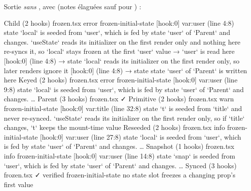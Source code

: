 Sortie \emph{sans} , avec  (notes élaguées sauf pour ) :

\begin{sortie}
  Child  (2 hooks)  frozen.tsx
    error  frozen-initial-state  [hook:0]  var:user  (line 4:8)  state `local` is seeded from `user`, which is fed by state `user` of `Parent` and changes. `useState` reads its initializer on the first render only and nothing here re-syncs it, so `local` stays frozen at the first `user` value
       → `user` is read here [hook:0] (line 4:8)
       → state `local` reads its initializer on the first render only, so later renders ignore it [hook:0] (line 4:8)
       → state state `user` of `Parent` is written here
  Keyed  (2 hooks)  frozen.tsx
    error  frozen-initial-state  [hook:0]  var:user  (line 9:8)  state `local` is seeded from `user`, which is fed by state `user` of `Parent` and changes. …
  Parent  (3 hooks)  frozen.tsx  ✓
  Primitive  (2 hooks)  frozen.tsx
    warn   frozen-initial-state  [hook:0]  var:title  (line 32:8)  state `t` is seeded from `title` and never re-synced. `useState` reads its initializer on the first render only, so if `title` changes, `t` keeps the mount-time value
  Reseeded  (2 hooks)  frozen.tsx
    info   frozen-initial-state  [hook:0]  var:user  (line 27:8)  state `local` is seeded from `user`, which is fed by state `user` of `Parent` and changes. …
  Snapshot  (1 hooks)  frozen.tsx
    info   frozen-initial-state  [hook:0]  var:user  (line 14:8)  state `snap` is seeded from `user`, which is fed by state `user` of `Parent` and changes. …
  Synced  (3 hooks)  frozen.tsx  ✓
    verified  frozen-initial-state  no state slot freezes a changing prop's first value
\end{sortie}

